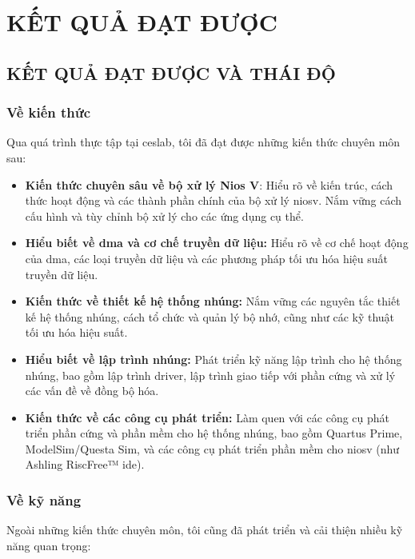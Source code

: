 \chapter{KẾT QUẢ ĐẠT ĐƯỢC}\label{chap:ket_qua}
\section{KẾT QUẢ ĐẠT ĐƯỢC VÀ THÁI ĐỘ} %

\subsection{Về kiến thức} %
\label{sec:knowledge_gained}

Qua quá trình thực tập tại \acrshort{ceslab}, tôi đã đạt được những kiến thức chuyên môn sau:

\begin{itemize}
    \item \textbf{Kiến thức chuyên sâu về bộ xử lý Nios V}: Hiểu rõ về kiến trúc, cách thức hoạt động và các thành phần chính của bộ xử lý \acrshort{niosv}. Nắm vững cách cấu hình và tùy chỉnh bộ xử lý cho các ứng dụng cụ thể. 
    \item \textbf{Hiểu biết về \acrshort{dma} và cơ chế truyền dữ liệu:} Hiểu rõ về cơ chế hoạt động của \acrshort{dma}, các loại truyền dữ liệu và các phương pháp tối ưu hóa hiệu suất truyền dữ liệu.
    \item \textbf{Kiến thức về thiết kế hệ thống nhúng:} Nắm vững các nguyên tắc thiết kế hệ thống nhúng, cách tổ chức và quản lý bộ nhớ, cũng như các kỹ thuật tối ưu hóa hiệu suất.
    \item \textbf{Hiểu biết về lập trình nhúng:} Phát triển kỹ năng lập trình cho hệ thống nhúng, bao gồm lập trình driver, lập trình giao tiếp với phần cứng và xử lý các vấn đề về đồng bộ hóa.
    \item \textbf{Kiến thức về các công cụ phát triển:} Làm quen với các công cụ phát triển phần cứng và phần mềm cho hệ thống nhúng, bao gồm Quartus Prime, ModelSim/Questa Sim, và các công cụ phát triển phần mềm cho \acrshort{niosv} (như Ashling RiscFree™ \acrshort{ide}). 
\end{itemize}

\subsection{Về kỹ năng}
\label{sec:skills_developed}

Ngoài những kiến thức chuyên môn, tôi cũng đã phát triển và cải thiện nhiều kỹ năng quan trọng:

